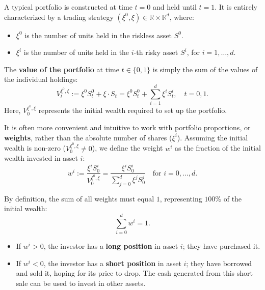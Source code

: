 A typical portfolio is constructed at time $t=0$ and held until $t=1$. It is entirely characterized by a trading strategy $(\xi^0, \xi) \in \mathbb{R} \times \mathbb{R}^d$, where:
\begin{itemize}
    \item $\xi^0$ is the number of units held in the riskless asset $S^0$.
    \item $\xi^i$ is the number of units held in the $i$-th risky asset $S^i$, for $i = 1, \dots, d$.
\end{itemize}

The \textbf{value of the portfolio} at time $t \in \{0, 1\}$ is simply the sum of the values of the individual holdings:
\begin{equation}
    V_t^{\xi^0, \xi} := \xi^0 S_t^0 + \xi \cdot S_t = \xi^0 S_t^0 + \sum_{i=1}^d \xi^i S_t^i, \quad t = 0, 1.
\end{equation}
Here, $V_0^{\xi^0, \xi}$ represents the initial wealth required to set up the portfolio.

It is often more convenient and intuitive to work with portfolio proportions, or \textbf{weights}, rather than the absolute number of shares ($\xi^i$). Assuming the initial wealth is non-zero ($V_0^{\xi^0, \xi} \neq 0$), we define the weight $w^i$ as the fraction of the initial wealth invested in asset $i$:
\begin{equation}
    w^i := \frac{\xi^i S_0^i}{V_0^{\xi^0, \xi}} = \frac{\xi^i S_0^i}{\sum_{j=0}^d \xi^j S_0^j} \quad \text{for } i = 0, \dots, d.
\end{equation}

By definition, the sum of all weights must equal $1$, representing $100\%$ of the initial wealth:
\begin{equation}
    \sum_{i=0}^d w^i = 1.
\end{equation}

\begin{remark}
\leavevmode
\begin{itemize}
    \item If $w^i > 0$, the investor has a \textbf{long position} in asset $i$; they have purchased it.
    \item If $w^i < 0$, the investor has a \textbf{short position} in asset $i$; they have borrowed and sold it, hoping for its price to drop. The cash generated from this short sale can be used to invest in other assets.
\end{itemize}
\end{remark}

